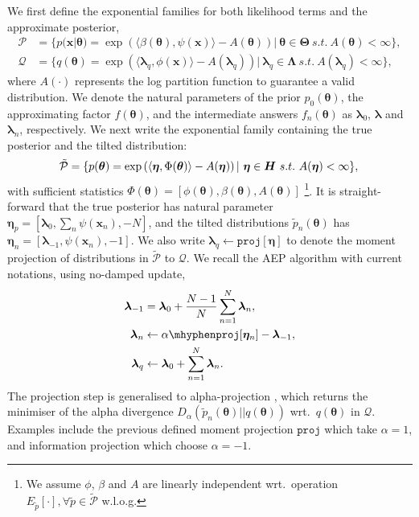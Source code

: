 \documentclass{article} %
\begin{document}
We first define the exponential families for both likelihood terms and the approximate posterior,
\begin{align}
\mathcal{P} &= \{p(\bm{x} | \bm{\theta}) = \exp \left( \langle \beta(\bm{\theta}), \psi(\bm{x}) \rangle - A(\bm{\theta}) \right) |\ \bm{\theta} \in \bm{\Theta} \ s.t.~ A(\bm{\theta}) < \infty \}, \\
\mathcal{Q} &= \{q(\bm{\theta}) = \exp \left( \langle \bm{\lambda}_q, \phi(\bm{x}) \rangle - A(\bm{\lambda}_q) \right) |\ \bm{\lambda}_q \in \bm{\Lambda} \ s.t.~ A(\bm{\lambda}_q) < \infty \},
\end{align}
where $A(\cdot)$ represents the log partition function to guarantee a valid distribution. We denote the natural parameters of the prior $p_0(\bm{\theta})$, the approximating factor $f(\bm{\theta})$, and the intermediate answers $f_n(\bm{\theta})$ as $\bm{\lambda}_0$, $\bm{\lambda}$ and $\bm{\lambda}_n$, respectively. We next write the exponential family containing the true posterior and the tilted distribution:
\begin{equation}
\mathcal{\tilde{P}} = \{p(\bm{\theta}) = \exp \left( \langle \bm{\eta}, \Phi(\bm{\theta}) \rangle - A(\bm{\eta}) \right) |\ \bm{\eta} \in \bm{H} \ s.t.~ A(\bm{\eta}) < \infty \}, \\
\end{equation}
with sufficient statistics $\Phi(\bm{\theta}) = [\phi(\bm{\theta}), \beta(\bm{\theta}), A(\bm{\theta})]$ \footnote{We assume $\phi$, $\beta$ and $A$ are linearly independent wrt.~operation $E_{\tilde{p}}[\cdot], \forall \tilde{p} \in \tilde{\mathcal{P}}$ w.l.o.g.}. It is straight-forward that the true posterior has natural parameter $\bm{\eta}_p = [\bm{\lambda}_0, \sum_{n} \psi(\bm{x}_n), -N]$, and the tilted distributions $\tilde{p}_n(\bm{\theta})$ has $\bm{\eta}_n = [\bm{\lambda}_{-1}, \psi(\bm{x}_n), -1]$. We also write $\bm{\lambda}_q \leftarrow \mathtt{proj}[\bm{\eta}]$ to denote the moment projection of distributions in $\mathcal{\tilde{P}}$ to $\mathcal{Q}$.
%
We recall the AEP algorithm with current notations, using no-damped update,
%
\begin{align}
\bm{\lambda}_{-1} & = \bm{\lambda}_0 + \frac{N-1}{N} \sum_{n=1}^N \bm{\lambda}_n, \\
\bm{\lambda}_n &\leftarrow \mathtt{\alpha \mhyphen proj}[\bm{\eta}_n] - \bm{\lambda}_{-1}, \\
\bm{\lambda}_q &\leftarrow \bm{\lambda}_0 + \sum_{n=1}^N \bm{\lambda}_n.
\end{align}
%
The projection step is generalised to alpha-projection \cite{amari:alpha_proj}, which returns the minimiser of the alpha divergence $D_{\alpha}(\tilde{p}_n(\bm{\theta}) || q(\bm{\theta}))$ wrt.~$q(\bm{\theta})$ in $\mathcal{Q}$. Examples include the previous defined moment projection $\mathtt{proj}$ which take $\alpha = 1$, and information projection which choose $\alpha = -1$. 
\end{document}
